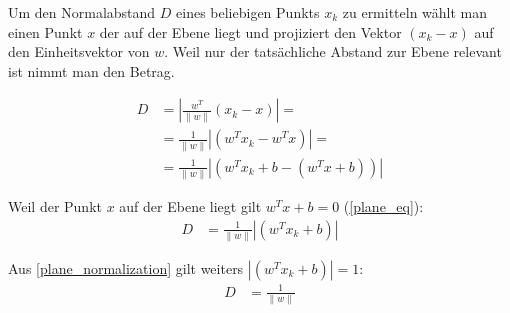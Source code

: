 \documentclass[a4paper,11pt,twoside]{scrreprt}
\begin{document}
Um den Normalabstand $D$ eines beliebigen Punkts $x_{k}$ zu ermitteln wählt man einen Punkt $x$ der auf der Ebene liegt und projiziert den Vektor $(x_{k} - x)$ auf den Einheitsvektor von $w$. Weil nur der tatsächliche Abstand zur Ebene relevant ist nimmt man den Betrag.

\begin{equation} \label{distance_to_plane}
	\begin{aligned}
		D &= | \frac{w^{T}}{\lVert w \rVert} (x_{k} - x) | = \\
		&= \frac{1}{\lVert w \rVert} | (w^{T} x_{k} - w^{T} x) | =\\
		&= \frac{1}{\lVert w \rVert} | (w^{T} x_{k} + b - (w^{T} x + b)) |
	\end{aligned}
\end{equation}

Weil der Punkt $x$ auf der Ebene liegt gilt $w^{T} x + b = 0$ (\autoref{plane_eq}):
\begin{equation} \label{distance_to_plane_simplified1}
	\begin{aligned}
		D &= \frac{1}{\lVert w \rVert} | (w^{T} x_{k} + b) |
	\end{aligned}
\end{equation}

Aus \autoref{plane_normalization} gilt weiters $| (w^{T} x_{k} + b) | = 1$:
\begin{equation} \label{distance_to_plane_simplified2}
	\begin{aligned}
		D &= \frac{1}{\lVert w \rVert}
	\end{aligned}
\end{equation}



\clearpage
{}
{}
\printbibliography
\end{document}
